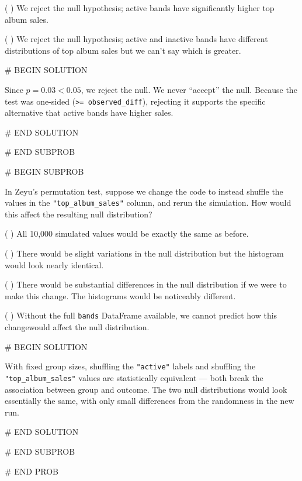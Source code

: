 \documentclass[twoside,12pt]{article}
\begin{document}
{\smallskip
( ) We reject the null hypothesis; active bands have significantly higher top album \gap sales.

\smallskip
( ) We reject the null hypothesis; active and inactive bands have different distributions \gap of top album sales but we can't say which is greater.



# BEGIN SOLUTION


Since $p = 0.03 < 0.05$, we reject the null. We never ``accept'' the null. Because the test was one-sided (\texttt{>= observed\_diff}), rejecting it supports the specific alternative that active bands have higher sales.


# END SOLUTION



# END SUBPROB

\bigskip

# BEGIN SUBPROB


In Zeyu's permutation test, suppose we change the code to instead shuffle the values in the \texttt{"top\_album\_sales"} column, and rerun the simulation. How would this affect the resulting null distribution?

\smallskip
( ) All 10,000 simulated values would be exactly the same as before.

\smallskip
( ) There would be slight variations in the null distribution but the histogram would \gap look nearly identical.

\smallskip
( ) There would be substantial differences in the null distribution if we were to make \gap this change. The histograms would be noticeably different.

\smallskip
( ) Without the full \texttt{bands} DataFrame available, we cannot predict how this change\gap would affect the null distribution.

# BEGIN SOLUTION


With fixed group sizes, shuffling the \texttt{"active"} labels and shuffling the \texttt{"top\_album\_sales"} values are statistically equivalent --- both break the association between group and outcome. The two null distributions would look essentially the same, with only small differences from the randomness in the new run.


# END SOLUTION



# END SUBPROB





# END PROB

}
\end{document}
